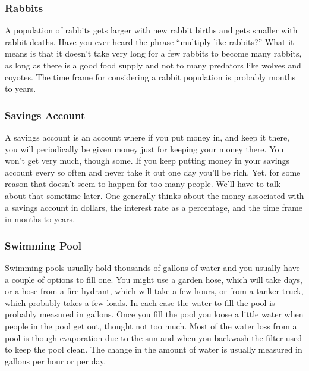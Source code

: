 \documentclass[]{memoir}
\begin{document}
\subsubsection{Rabbits}

A population of rabbits gets larger with new rabbit births and gets
smaller with rabbit deaths. Have you ever heard the phrase ``multiply
like rabbits?'' What it means is that it doesn't take very long for a
few rabbits to become many rabbits, as long as there is a good food
supply and not to many predators like wolves and coyotes. The time frame
for considering a rabbit population is probably months to years.

\subsubsection{Savings Account}

A savings account is an account where if you put money in, and keep it
there, you will periodically be given money just for keeping your money
there. You won't get very much, though some. If you keep putting money
in your savings account every so often and never take it out one day
you'll be rich. Yet, for some reason that doesn't seem to happen for too
many people. We'll have to talk about that sometime later. One generally
thinks about the money associated with a savings account in dollars, the
interest rate as a percentage, and the time frame in months to years.

\subsubsection{Swimming Pool}

Swimming pools usually hold thousands of gallons of water and you
usually have a couple of options to fill one. You might use a garden
hose, which will take days, or a hose from a fire hydrant, which will
take a few hours, or from a tanker truck, which probably takes a few
loads. In each case the water to fill the pool is probably measured in
gallons. Once you fill the pool you loose a little water when people in
the pool get out, thought not too much. Most of the water loss from a
pool is though evaporation due to the sun and when you backwash the
filter used to keep the pool clean. The change in the amount of water is
usually measured in gallons per hour or per day.

\paragraph{}
\end{document}
